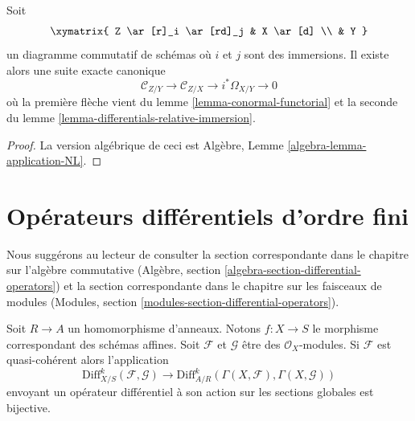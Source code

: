 \begin{lemma}
\label{lemma-two-immersions}
Soit
$$
\xymatrix{
Z \ar[r]_i \ar[rd]_j & X \ar[d] \\
& Y
}
$$
un diagramme commutatif de schémas où $i$ et $j$ sont des immersions.
Il existe alors une suite exacte canonique
$$
\mathcal{C}_{Z/Y} \to
\mathcal{C}_{Z/X} \to
i^*\Omega_{X/Y} \to 0
$$
où la première flèche
vient du lemme \ref{lemma-conormal-functorial}
et la
seconde du lemme \ref{lemma-differentials-relative-immersion}.
\end{lemma}

\begin{proof}
La version algébrique de
ceci est Algèbre, Lemme \ref{algebra-lemma-application-NL}.
\end{proof}










\section{Opérateurs différentiels d'ordre fini}
\label{section-differential-operators}

\noindent
Nous suggérons au lecteur de consulter la section correspondante
dans le chapitre sur
l'algèbre commutative (Algèbre, section \ref{algebra-section-differential-operators})
et la section correspondante dans le chapitre sur les
faisceaux de modules (Modules, section \ref{modules-section-differential-operators}).

\begin{lemma}
\label{lemma-affine-case-differential-operators}
Soit $R \to A$ un homomorphisme d'anneaux. Notons $f : X \to S$ le morphisme
correspondant des schémas affines. Soit $\mathcal{F}$ et $\mathcal{G}$ être
des $\mathcal{O}_X$-modules. Si $\mathcal{F}$ est quasi-cohérent alors
l'application
$$
\text{Diff}^k_{X/S}(\mathcal{F}, \mathcal{G}) \to
\text{Diff}^k_{A/R}(\Gamma(X, \mathcal{F}), \Gamma(X, \mathcal{G}))
$$
envoyant un opérateur différentiel à son action sur les sections globales
est bijective.
\end{lemma}

